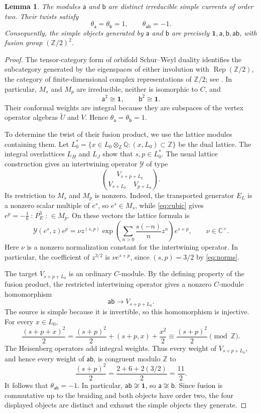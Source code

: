 \documentclass[11pt,reqno]{amsart}
\newtheorem{lemma}[theorem]{Lemma}
\theoremstyle{definition}\newtheorem{definition}[theorem]{Definition}
\theoremstyle{remark}\newtheorem{remark}[theorem]{Remark}
\newcommand{\C}{\mathbb C}\newcommand{\Z}{\mathbb Z}\newcommand{\Q}{\mathbb Q}
\newcommand{\one}{\mathbf1}\newcommand{\slc}{\mathfrak{sl}_2}
\newcommand{\Rep}{\operatorname{Rep}}
\newcommand{\nn}[1]{\mathopen{:}#1\mathclose{:}}
\numberwithin{equation}{section}
\begin{document}
\begin{lemma}\label{lem:twists}
The modules $\mathsf a$ and $\mathsf b$ are distinct irreducible simple currents of order two. Their twists satisfy
\[
 \theta_{\mathsf a}=\theta_{\mathsf b}=1,\qquad
 \theta_{\mathsf a\mathsf b}=-1.
\]
Consequently, the simple objects generated by $\mathsf a$ and $\mathsf b$ are precisely $\one,\mathsf a,\mathsf b,\mathsf a\mathsf b$, with fusion group $(\Z/2)^2$.
\end{lemma}
\begin{proof}
The tensor-category form of orbifold Schur--Weyl duality identifies the subcategory generated by the eigenspaces of either involution with $\Rep(\Z/2)$, the category of finite-dimensional complex representations of $\Z/2$; see \cite[Corollary 4.8]{McRaeOrb}. In particular, $M_s$ and $M_p$ are irreducible, neither is isomorphic to $C$, and
\[
 \mathsf a^2\cong\one,\qquad \mathsf b^2\cong\one.
\]
Their conformal weights are integral because they are subspaces of the vertex operator algebras $\widetilde U$ and $V$. Hence $\theta_{\mathsf a}=\theta_{\mathsf b}=1$.

To determine the twist of their fusion product, we use the lattice modules containing them. Let $L_0^*=\{x\in L_0\otimes_{\Z}\Q:(x,L_0)\subset\Z\}$ be the dual lattice. The integral overlattices $L_H$ and $L_J$ show that $s,p\in L_0^*$. The usual lattice construction gives an intertwining operator $\mathcal Y$ of type
\[
 \binom{V_{s+p+L_0}}{V_{s+L_0}\quad V_{p+L_0}}.
\]
Its restriction to $M_s$ and $M_p$ is nonzero. Indeed, the transported generator $E_L$ is a nonzero scalar multiple of $e^s$, so $e^s\in M_s$, while \eqref{eq:cubic} gives $e^p=-\frac16\nn{P_E^3}\in M_p$. On these vectors the lattice formula is
\[
 \mathcal Y(e^s,z)e^p
 =\nu z^{(s,p)}
   \exp\!\left(\sum_{n>0}\frac{s(-n)}{n}z^n\right)e^{s+p},
 \qquad \nu\in\C^\times.
\]
Here $\nu$ is a nonzero normalization constant for the intertwining operator. In particular, the coefficient of $z^{3/2}$ is $\nu e^{s+p}$, since $(s,p)=3/2$ by \eqref{eq:norms}.

The target $V_{s+p+L_0}$ is an ordinary $C$-module. By the defining property of the fusion product, the restricted intertwining operator gives a nonzero $C$-module homomorphism
\[
 \mathsf a\mathsf b\longrightarrow V_{s+p+L_0}.
\]
The source is simple because it is invertible, so this homomorphism is injective. For every $x\in L_0$,
\[
 \frac{(s+p+x)^2}{2}
 =\frac{(s+p)^2}{2}+(s+p,x)+\frac{x^2}{2}
 \equiv\frac{(s+p)^2}{2}\pmod{\Z}.
\]
The Heisenberg operators add integral weights. Thus every weight of $V_{s+p+L_0}$, and hence every weight of $\mathsf a\mathsf b$, is congruent modulo $\Z$ to
\[
 \frac{(s+p)^2}{2}
 =\frac{2+6+2(3/2)}{2}=\frac{11}{2}.
\]
It follows that $\theta_{\mathsf a\mathsf b}=-1$. In particular, $\mathsf a\mathsf b\not\cong\one$, so $\mathsf a\not\cong\mathsf b$. Since fusion is commutative up to the braiding and both objects have order two, the four displayed objects are distinct and exhaust the simple objects they generate.
\end{proof}
\end{document}
